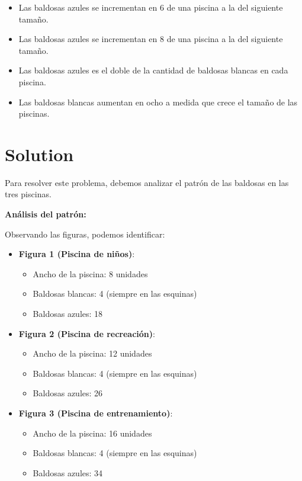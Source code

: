 \documentclass[
]{article}
\providecommand{\tightlist}{%
  \setlength{\itemsep}{0pt}\setlength{\parskip}{0pt}}
\begin{document}
\begin{itemize}
\tightlist
\item
  Las baldosas azules se incrementan en 6 de una piscina a la del
  siguiente tamaño.
\item
  Las baldosas azules se incrementan en 8 de una piscina a la del
  siguiente tamaño.
\item
  Las baldosas azules es el doble de la cantidad de baldosas blancas en
  cada piscina.
\item
  Las baldosas blancas aumentan en ocho a medida que crece el tamaño de
  las piscinas.
\end{itemize}

\section{Solution}\label{solution}

Para resolver este problema, debemos analizar el patrón de las baldosas
en las tres piscinas.

\textbf{Análisis del patrón:}

Observando las figuras, podemos identificar:

\begin{itemize}
\tightlist
\item
  \textbf{Figura 1 (Piscina de niños)}:

  \begin{itemize}
  \tightlist
  \item
    Ancho de la piscina: 8 unidades
  \item
    Baldosas blancas: 4 (siempre en las esquinas)
  \item
    Baldosas azules: 18
  \end{itemize}
\item
  \textbf{Figura 2 (Piscina de recreación)}:

  \begin{itemize}
  \tightlist
  \item
    Ancho de la piscina: 12 unidades
  \item
    Baldosas blancas: 4 (siempre en las esquinas)
  \item
    Baldosas azules: 26
  \end{itemize}
\item
  \textbf{Figura 3 (Piscina de entrenamiento)}:

  \begin{itemize}
  \tightlist
  \item
    Ancho de la piscina: 16 unidades
  \item
    Baldosas blancas: 4 (siempre en las esquinas)
  \item
    Baldosas azules: 34
  \end{itemize}
\end{itemize}
\end{document}
